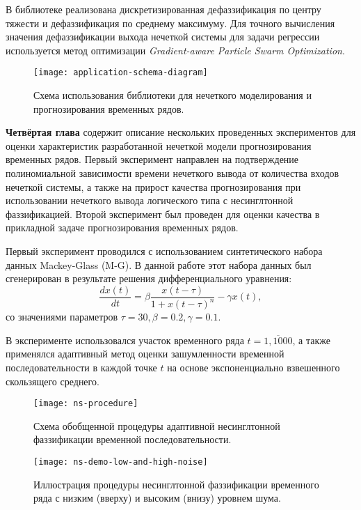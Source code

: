 В библиотеке реализована дискретизированная дефаззификация по центру тяжести и дефаззификация по среднему максимуму. Для точного вычисления значения дефаззификации выхода нечеткой системы для задачи регрессии используется метод оптимизации \textit{Gradient-aware Particle Swarm Optimization}.

\begin{figure}[ht]
	\centering
	\texttt{[image: application-schema-diagram]}
	\caption{Схема использования библиотеки для нечеткого моделирования и прогнозирования временных рядов.}
	\label{fig:application-schema-diagram}
\end{figure}

\textbf{Четвёртая глава} содержит описание нескольких проведенных экспериментов для оценки характеристик разработанной нечеткой модели прогнозирования временных рядов. Первый эксперимент направлен на подтверждение полиномиальной зависимости времени нечеткого вывода от количества входов нечеткой системы, а также на прирост качества прогнозирования при использовании нечеткого вывода логического типа с несинглтонной фаззификацией. Второй эксперимент был проведен для оценки качества в прикладной задаче прогнозирования временных рядов.

Первый эксперимент проводился с использованием синтетического набора данных Mackey-Glass (M-G). В данной работе этот набора данных был сгенерирован в результате решения дифференциального уравнения:
\begin{equation}
	\frac{dx(t)}{dt} = \beta\frac{x(t-\tau)}{1+x(t-\tau)^n}-\gamma x(t)
	\label{eqn:mackey-glass-definition},
\end{equation}
со значениями параметров $\tau = 30, \beta = 0.2, \gamma = 0.1$.

В эксперименте использовался участок временного ряда $t=\overline{1,1000}$, а также применялся адаптивный метод оценки зашумленности временной последовательности в каждой точке $t$ на основе экспоненциально взвешенного скользящего среднего.

\begin{figure}[ht]
	\begin{minipage}[c]{0.49\textwidth}
		\centering
		\texttt{[image: ns-procedure]}
		\caption{Схема обобщенной процедуры адаптивной несинглтонной фаззификации временной последовательности.}
		\label{fig:ns-procedure}
	\end{minipage}
	\hfill
	\begin{minipage}[c]{0.49\textwidth}
		\centering
		\texttt{[image: ns-demo-low-and-high-noise]}
		\caption{Иллюстрация процедуры несинглтонной фаззификации временного ряда с низким (вверху) и высоким (внизу) уровнем шума.}
		\label{fig:ns-demo-low-and-high-noise}
	\end{minipage}
\end{figure}

